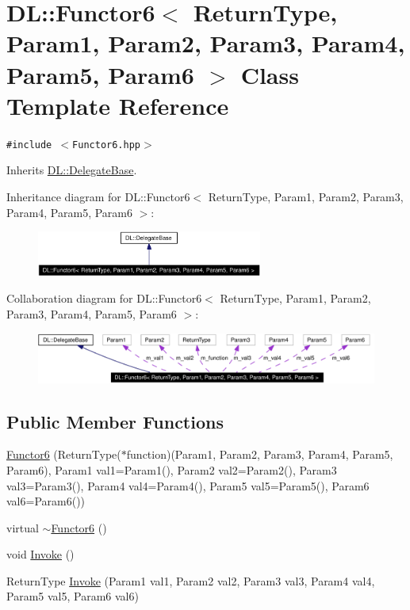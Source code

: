 \hypertarget{classDL_1_1Functor6}{
\section{DL::Functor6$<$ Return\-Type, Param1, Param2, Param3, Param4, Param5, Param6 $>$ Class Template Reference}
\label{classDL_1_1Functor6}
}
{\tt \#include $<$Functor6.hpp$>$}

Inherits \hyperlink{classDL_1_1DelegateBase}{DL::Delegate\-Base}.

Inheritance diagram for DL::Functor6$<$ Return\-Type, Param1, Param2, Param3, Param4, Param5, Param6 $>$:\begin{figure}[H]
\begin{center}
\leavevmode
\includegraphics[width=210pt]{classDL_1_1Functor6__inherit__graph}
\end{center}
\end{figure}
Collaboration diagram for DL::Functor6$<$ Return\-Type, Param1, Param2, Param3, Param4, Param5, Param6 $>$:\begin{figure}[H]
\begin{center}
\leavevmode
\includegraphics[width=321pt]{classDL_1_1Functor6__coll__graph}
\end{center}
\end{figure}
\subsection*{Public Member Functions}
\begin{CompactItemize}
\item 
\hyperlink{classDL_1_1Functor6_a0}{Functor6} (Return\-Type($\ast$function)(Param1, Param2, Param3, Param4, Param5, Param6), Param1 val1=Param1(), Param2 val2=Param2(), Param3 val3=Param3(), Param4 val4=Param4(), Param5 val5=Param5(), Param6 val6=Param6())
\item 
virtual \hyperlink{classDL_1_1Functor6_a1}{$\sim$Functor6} ()
\item 
void \hyperlink{classDL_1_1Functor6_a2}{Invoke} ()
\item 
Return\-Type \hyperlink{classDL_1_1Functor6_a3}{Invoke} (Param1 val1, Param2 val2, Param3 val3, Param4 val4, Param5 val5, Param6 val6)
\end{CompactItemize}
